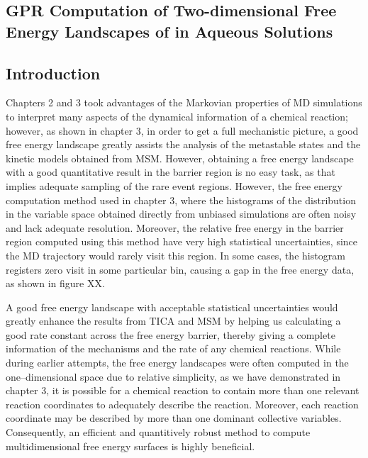\begin{spacing}{2.0}
    \chapter{GPR Computation of Two-dimensional Free Energy Landscapes of  in Aqueous Solutions}

    \section{Introduction}

    Chapters 2 and 3 took advantages of the Markovian properties of MD simulations to interpret many aspects of the dynamical information of a 
    chemical reaction; however, as shown in chapter 3, in order to get a full mechanistic picture, a good free energy landscape greatly assists
    the analysis of the metastable states and the kinetic models obtained from MSM. However, obtaining a free energy landscape with a good
    quantitative result in the barrier region is no easy task, as that implies adequate sampling of the rare event regions. However, the free
    energy computation method used in chapter 3, where the histograms of the distribution in the variable space obtained directly from unbiased
    simulations are often noisy and lack adequate resolution. Moreover, the relative free energy in the barrier region computed using this method
    have very high statistical uncertainties, since the MD trajectory would rarely visit this region. In some cases, the histogram registers zero
    visit in some particular bin, causing a gap in the free energy data, as shown in figure XX.

    A good free energy landscape with acceptable statistical uncertainties would greatly enhance the results from TICA and MSM by helping us 
    calculating a good rate constant across the free energy barrier, thereby giving a complete information of the mechanisms and the rate of any
    chemical reactions. While during earlier attempts, the free energy landscapes were often computed in the one--dimensional space due to 
    relative simplicity, as we have demonstrated in chapter 3, it is possible for a chemical reaction to contain more than one relevant reaction
    coordinates to adequately describe the reaction. Moreover, each reaction coordinate may be described by more than one dominant collective
    variables. Consequently, an efficient and quantitively robust method to compute multidimensional free energy surfaces is highly beneficial.


\end{spacing}
